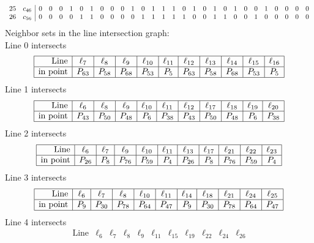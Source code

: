 \documentclass{article}
\begin{document}
{{$$\begin{array}{rr|*{27}r}
25 & c_{46} & 0 & 0 & 0 & 1 & 0 & 1 & 0 & 0 & 0 & 1 & 0 & 1 & 1 & 1 & 0 & 1 & 0 & 1 & 0 & 1 & 0 & 0 & 1 & 0 & 0 & 0 & 0\\
26 & c_{56} & 0 & 0 & 0 & 0 & 1 & 1 & 0 & 0 & 0 & 0 & 1 & 1 & 1 & 1 & 1 & 0 & 0 & 1 & 1 & 0 & 0 & 1 & 0 & 0 & 0 & 0 & 0\\
\end{array}
$$
}%
Neighbor sets in the line intersection graph:\\
Line 0 intersects 
$$
\begin{array}{|r*{10}{|c}|}
\hline
\mbox{Line}  & \ell_{7} & \ell_{8} & \ell_{9} & \ell_{10} & \ell_{11} & \ell_{12} & \ell_{13} & \ell_{14} & \ell_{15} & \ell_{16}\\
\hline
\mbox{in point}  & P_{63} & P_{58} & P_{68} & P_{53} & P_{5} & P_{63} & P_{58} & P_{68} & P_{53} & P_{5}\\
\hline
\end{array}
$$
Line 1 intersects 
$$
\begin{array}{|r*{10}{|c}|}
\hline
\mbox{Line}  & \ell_{6} & \ell_{8} & \ell_{9} & \ell_{10} & \ell_{11} & \ell_{12} & \ell_{17} & \ell_{18} & \ell_{19} & \ell_{20}\\
\hline
\mbox{in point}  & P_{43} & P_{50} & P_{48} & P_{6} & P_{38} & P_{43} & P_{50} & P_{48} & P_{6} & P_{38}\\
\hline
\end{array}
$$
Line 2 intersects 
$$
\begin{array}{|r*{10}{|c}|}
\hline
\mbox{Line}  & \ell_{6} & \ell_{7} & \ell_{9} & \ell_{10} & \ell_{11} & \ell_{13} & \ell_{17} & \ell_{21} & \ell_{22} & \ell_{23}\\
\hline
\mbox{in point}  & P_{26} & P_{8} & P_{76} & P_{59} & P_{4} & P_{26} & P_{8} & P_{76} & P_{59} & P_{4}\\
\hline
\end{array}
$$
Line 3 intersects 
$$
\begin{array}{|r*{10}{|c}|}
\hline
\mbox{Line}  & \ell_{6} & \ell_{7} & \ell_{8} & \ell_{10} & \ell_{11} & \ell_{14} & \ell_{18} & \ell_{21} & \ell_{24} & \ell_{25}\\
\hline
\mbox{in point}  & P_{9} & P_{30} & P_{78} & P_{64} & P_{47} & P_{9} & P_{30} & P_{78} & P_{64} & P_{47}\\
\hline
\end{array}
$$
Line 4 intersects 
$$
\begin{array}{|r*{10}{|c}|}
\hline
\mbox{Line}  & \ell_{6} & \ell_{7} & \ell_{8} & \ell_{9} & \ell_{11} & \ell_{15} & \ell_{19} & \ell_{22} & \ell_{24} & \ell_{26}\\

\end{array}$$}
\end{document}
